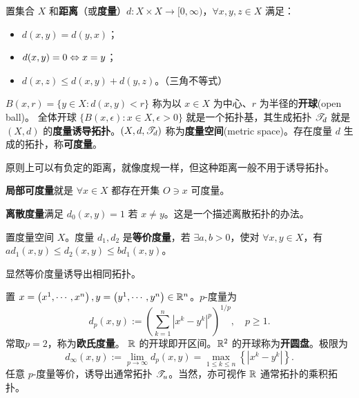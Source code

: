 \begin{definition}\label{def:metric_topo}
    置集合 $X$ 和\textbf{距离}（或\textbf{度量}）$d: X \times X \to [0,\infty)$，$\forall x,y,z\in X$ 满足：
    \begin{itemize}
        \item $d(x,y)=d(y,x)$；
        \item $d(x,y) = 0\Leftrightarrow x=y$；
        \item $d(x,z) \leqslant d(x,y)+d(y,z)$。（三角不等式）
    \end{itemize}
    $B(x,r)=\{y \in X: d(x, y)<r\}$ 称为以 $x \in X$ 为中心、$r$ 为半径的\textbf{开球}(open ball)。
    全体开球 $\{B(x,\epsilon):x\in X,\epsilon >0\}$ 就是一个拓扑基，其生成拓扑 $\mathscr T_d$ 就是 $(X,d)$ 的\textbf{度量诱导拓扑}。$(X,d,\mathscr T_d)$ 称为\textbf{度量空间}(metric space)。存在度量 $d$ 生成的拓扑，称\textbf{可度量}。
\end{definition}

\begin{remark}
    原则上可以有负定的距离，就像度规一样，但这种距离一般不用于诱导拓扑。
\end{remark}

\begin{definition}
    \textbf{局部可度量}就是 $\forall x\in X$ 都存在开集 $O\ni x$ 可度量。
\end{definition}

\begin{example}
    \textbf{离散度量}满足 $d_{0}(x,y)=1$ 若 $x \ne y$。这是一个描述离散拓扑的办法。
\end{example}

\begin{definition}
    置度量空间 $X$。度量 $d_{1},d_{2}$ 是\textbf{等价度量}，若 $\exists a,b>0$，使对 $\forall x,y \in X$，有 $a d_{1}(x, y) \leqslant d_{2}(x, y) \leqslant b d_{1}(x, y)$。
\end{definition}

\begin{remark}
    显然等价度量诱导出相同拓扑。
\end{remark}

\begin{example}
    置 $x=\left(x^1,\cdots,x^{n}\right),y=\left(y^{1},\cdots,y^{n}\right)\in\mathbb{R}^{n}$。$p$-度量为
\[
d_{p}(x, y):=\left(\sum_{k=1}^{n}\left|x^{k}-y^{k}\right|^{p}\right)^{1 / p},\quad p \geqslant 1.
\]
常取$p=2$，称为\textbf{欧氏度量}。
$\mathbb{R}$ 的开球即开区间。$\mathbb{R}^2$ 的开球称为\textbf{开圆盘}。极限为
\[
d_{\infty}(x,y):=\lim_{p\to\infty}d_{p}(x, y)=\max _{1 \leqslant k \leqslant n}\left\{\left|x^{k}-y^{k}\right|\right\}.
\]
任意 $p$-度量等价，诱导出通常拓扑 $\mathscr T_u$。当然，亦可视作 $\mathbb{R}$ 通常拓扑的乘积拓扑。
\end{example}

